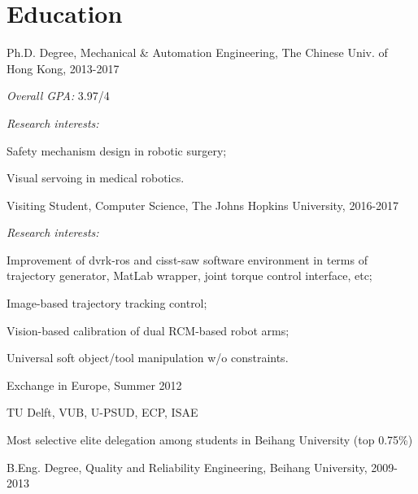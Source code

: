 \documentclass[10pt,letterpaper]{article}
\renewenvironment{itemize}{
\begin{list}{}{
    \setlength{\leftmargin}{1.5em}
    \setlength{\itemsep}{0.25em}
    \setlength{\parskip}{0pt}
    \setlength{\parsep}{0.25em}
    }
    }{
\end{list}
}
\begin{document}
\section*{Education}

\begin{itemize}
    \item Ph.D. Degree, Mechanical \& Automation Engineering, The Chinese Univ. of Hong Kong, 2013-2017
    \begin{itemize}
        \item \emph{Overall GPA:} 3.97/4
        \item \emph{Research interests:}
        \begin{itemize}
            \item Safety mechanism design in robotic surgery;
            \item Visual servoing in medical robotics.
        \end{itemize}
    \end{itemize}
    \item Visiting Student, Computer Science, The Johns Hopkins University, 2016-2017
    \begin{itemize}
        \item \emph{Research interests:}
        \begin{itemize}
            \item Improvement of dvrk-ros and cisst-saw software environment in terms of trajectory generator, MatLab wrapper, joint torque control interface, etc;
            \item Image-based trajectory tracking control;
            \item Vision-based calibration of dual RCM-based robot arms;
            \item Universal soft object/tool manipulation w/o constraints.
        \end{itemize}
    \end{itemize}
    \item Exchange in Europe, Summer 2012
    \begin{itemize}
        \item TU Delft, VUB, U-PSUD, ECP, ISAE
        \item Most selective elite delegation among students in Beihang University (top 0.75\%)
    \end{itemize}
    \item B.Eng. Degree, Quality and Reliability Engineering, Beihang University, 2009-2013
    \begin{itemize}

\end{itemize}
\end{itemize}
\end{document}
